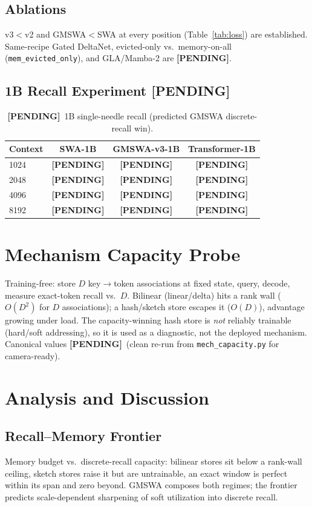 \documentclass[11pt]{article}
\newcommand{\pending}{\textbf{[PENDING]}}
\begin{document}
\subsection{Ablations}
v3${<}$v2 and GMSWA${<}$SWA at every position (Table~\ref{tab:loss}) are established.
Same-recipe Gated DeltaNet, evicted-only vs.\ memory-on-all (\texttt{mem\_evicted\_only}),
and GLA/Mamba-2 are \pending.

\subsection{1B Recall Experiment \pending}
\begin{table}[H]\centering
\caption{\pending\ 1B single-needle recall (predicted GMSWA discrete-recall win).}
\begin{tabular}{lccc}
\toprule
Context & SWA-1B & GMSWA-v3-1B & Transformer-1B \\
\midrule
1024 & \pending & \pending & \pending \\
2048 & \pending & \pending & \pending \\
4096 & \pending & \pending & \pending \\
8192 & \pending & \pending & \pending \\
\bottomrule
\end{tabular}
\end{table}

\section{Mechanism Capacity Probe}\label{sec:probe}
Training-free: store $D$ key$\rightarrow$token associations at fixed state, query, decode,
measure exact-token recall vs.\ $D$. Bilinear (linear/delta) hits a rank wall ($O(D^2)$ for
$D$ associations); a hash/sketch store escapes it ($O(D)$), advantage growing under load.
The capacity-winning hash store is \emph{not} reliably trainable (hard/soft addressing),
so it is used as a diagnostic, not the deployed mechanism. Canonical values \pending\ (clean
re-run from \texttt{mech\_capacity.py} for camera-ready).

\section{Analysis and Discussion}
\subsection{Recall--Memory Frontier}
Memory budget vs.\ discrete-recall capacity: bilinear stores sit below a rank-wall ceiling,
sketch stores raise it but are untrainable, an exact window is perfect within its span and
zero beyond. GMSWA composes both regimes; the frontier predicts scale-dependent sharpening
of soft utilization into discrete recall.
\end{document}
